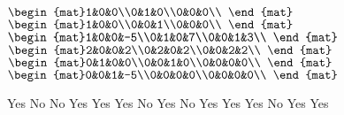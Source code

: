 \begin{Exercise}[
name={},
title={}, 
difficulty=0,
origin={\cite{GH}}]
\begin{multicols}{3}
\Question $\begin{mat}1&0&0\\0&1&0\\0&0&0\\ \end{mat}$
\Question $\begin{mat}1&0&0\\0&0&1\\0&0&0\\ \end{mat}$
\Question $\begin{mat}1&0&0&-5\\0&1&0&7\\0&0&1&3\\ \end{mat}$
\Question $\begin{mat}2&0&0&2\\0&2&0&2\\0&0&2&2\\ \end{mat}$
\Question $\begin{mat}0&1&0&0\\0&0&1&0\\0&0&0&0\\ \end{mat}$
\Question $\begin{mat}0&0&1&-5\\0&0&0&0\\0&0&0&0\\ \end{mat}$
\EndCurrentQuestion
\end{multicols}
\end{Exercise}

\begin{Answer}
\Question Yes
\Question No
\Question No
\Question Yes
\Question Yes
\Question Yes
\Question No
\Question Yes
\Question No
\Question Yes
\Question Yes
\Question Yes
\Question No
\Question Yes
\Question Yes
\end{Answer}
